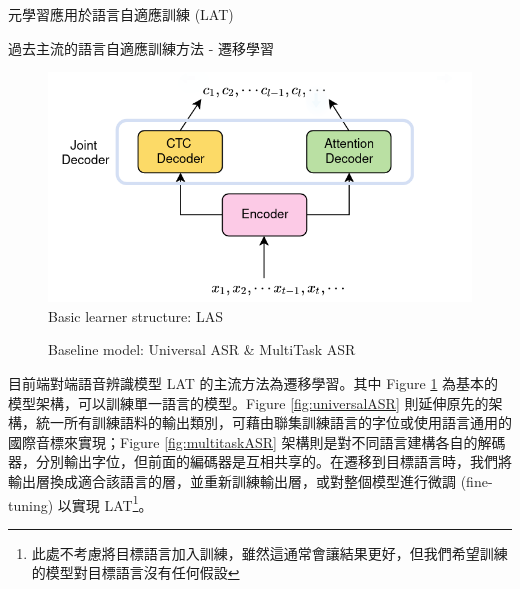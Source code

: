 \documentclass[12pt,UTF8,fntef]{article}
\begin{document}
  \begin{section}{元學習應用於語言自適應訓練 (LAT)}
    \begin{subsection}{過去主流的語言自適應訓練方法 - 遷移學習} \label{trans-asr}

    \begin{figure}[ht]
        \centering
        \includegraphics[width=0.6\linewidth]{monoASR.png}
        \caption{Basic learner structure: LAS}
        \label{fig:monoASR}
    \end{figure}

    \vspace{-0.25in}

    \begin{figure}[ht]
      \centering
      \caption{Baseline model: Universal ASR \& MultiTask ASR}
    \end{figure}

    目前端對端語音辨識模型 LAT 的主流方法為遷移學習。其中 Figure \ref{fig:monoASR} 為基本的模型架構，可以訓練單一語言的模型。Figure \ref{fig:universalASR} 則延伸原先的架構，統一所有訓練語料的輸出類別，可藉由聯集訓練語言的字位或使用語言通用的國際音標來實現；Figure \ref{fig:multitaskASR} 架構則是對不同語言建構各自的解碼器，分別輸出字位，但前面的編碼器是互相共享的。在遷移到目標語言時，我們將輸出層換成適合該語言的層，並重新訓練輸出層，或對整個模型進行微調 (fine-tuning) 以實現 LAT\footnote{此處不考慮將目標語言加入訓練，雖然這通常會讓結果更好，但我們希望訓練的模型對目標語言沒有任何假設}。


\end{subsection}
\end{section}
\end{document}
